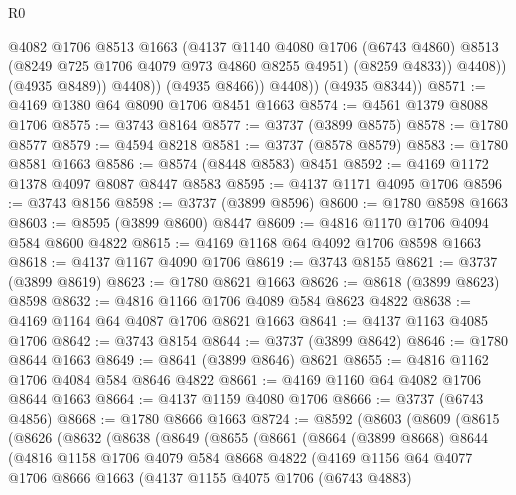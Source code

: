 \begin{lexlean}{R0}
\begin{coremodule}
                      @4082
                      @1706
                      @8513
                      @1663
                      (@4137
                        @1140
                        @4080
                        @1706
                        (@6743 @4860)
                        @8513
                        (@8249 @725 @1706 @4079 @973 @4860 @8255 @4951)
                        (@8259 @4833))
                      @4408))
                  (@4935 @8489))
                @4408))
            (@4935 @8466))
          @4408))
      (@4935 @8344))
@8571 := @4169 @1380 @64 @8090 @1706 @8451 @1663
@8574 := @4561 @1379 @8088 @1706
@8575 := @3743 @8164
@8577 := @3737 (@3899 @8575)
@8578 := @1780 @8577
@8579 := @4594 @8218
@8581 := @3737 (@8578 @8579)
@8583 := @1780 @8581 @1663
@8586 := @8574 (@8448 @8583) @8451
@8592 := @4169 @1172 @1378 @4097 @8087 @8447 @8583
@8595 := @4137 @1171 @4095 @1706
@8596 := @3743 @8156
@8598 := @3737 (@3899 @8596)
@8600 := @1780 @8598 @1663
@8603 := @8595 (@3899 @8600) @8447
@8609 := @4816 @1170 @1706 @4094 @584 @8600 @4822
@8615 := @4169 @1168 @64 @4092 @1706 @8598 @1663
@8618 := @4137 @1167 @4090 @1706
@8619 := @3743 @8155
@8621 := @3737 (@3899 @8619)
@8623 := @1780 @8621 @1663
@8626 := @8618 (@3899 @8623) @8598
@8632 := @4816 @1166 @1706 @4089 @584 @8623 @4822
@8638 := @4169 @1164 @64 @4087 @1706 @8621 @1663
@8641 := @4137 @1163 @4085 @1706
@8642 := @3743 @8154
@8644 := @3737 (@3899 @8642)
@8646 := @1780 @8644 @1663
@8649 := @8641 (@3899 @8646) @8621
@8655 := @4816 @1162 @1706 @4084 @584 @8646 @4822
@8661 := @4169 @1160 @64 @4082 @1706 @8644 @1663
@8664 := @4137 @1159 @4080 @1706
@8666 := @3737 (@6743 @4856)
@8668 := @1780 @8666 @1663
@8724 := @8592
    (@8603
      (@8609
        (@8615
          (@8626
            (@8632
              (@8638
                (@8649
                  (@8655
                    (@8661
                      (@8664
                        (@3899 @8668)
                        @8644
                        (@4816
                          @1158
                          @1706
                          @4079
                          @584
                          @8668
                          @4822
                          (@4169
                            @1156
                            @64
                            @4077
                            @1706
                            @8666
                            @1663
                            (@4137
                              @1155
                              @4075
                              @1706
                              (@6743 @4883)

\end{coremodule}
\end{lexlean}
